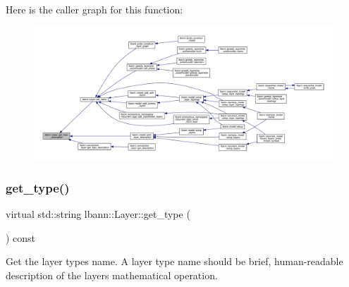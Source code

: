 Here is the caller graph for this function\+:\nopagebreak
\begin{figure}[H]
\begin{center}
\leavevmode
\includegraphics[width=350pt]{classlbann_1_1Layer_a147a7f7dcf0027a60f10109439e5dcea_icgraph}
\end{center}
\end{figure}
\mbox{\label{classlbann_1_1Layer_a0fa0ea9160b490c151c0a17fde4f7239}} 
\subsubsection{\texorpdfstring{get\+\_\+type()}{get\_type()}}
{\footnotesize\ttfamily virtual std\+::string lbann\+::\+Layer\+::get\+\_\+type (\begin{DoxyParamCaption}{ }\end{DoxyParamCaption}) const\hspace{0.3cm}{\ttfamily [pure virtual]}}

Get the layer type\textquotesingle{}s name. A layer type name should be brief, human-\/readable description of the layer\textquotesingle{}s mathematical operation. 


